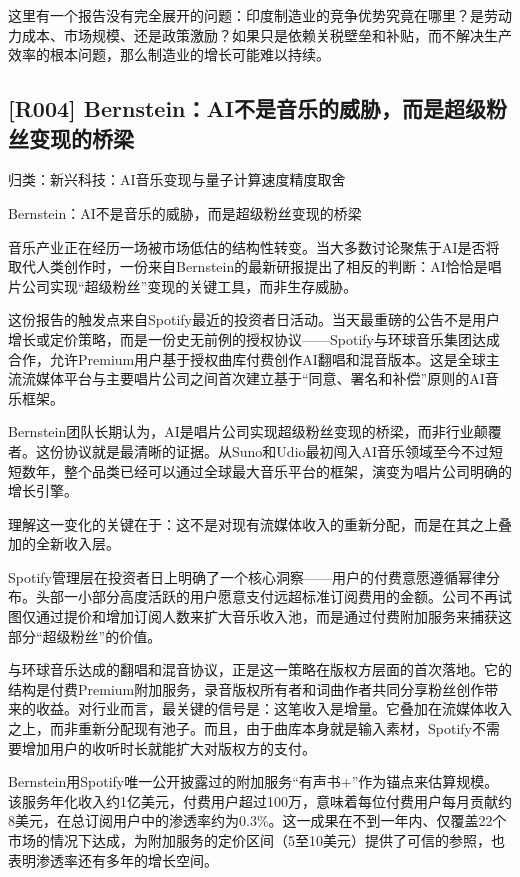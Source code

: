 \documentclass[11pt]{ctexart}
\begin{document}
这里有一个报告没有完全展开的问题：印度制造业的竞争优势究竟在哪里？是劳动力成本、市场规模、还是政策激励？如果只是依赖关税壁垒和补贴，而不解决生产效率的根本问题，那么制造业的增长可能难以持续。

\subsection{[R004] Bernstein：AI不是音乐的威胁，而是超级粉丝变现的桥梁}
{\small\color{refgray}归类：新兴科技：AI音乐变现与量子计算速度精度取舍}

Bernstein：AI不是音乐的威胁，而是超级粉丝变现的桥梁

音乐产业正在经历一场被市场低估的结构性转变。当大多数讨论聚焦于AI是否将取代人类创作时，一份来自Bernstein的最新研报提出了相反的判断：AI恰恰是唱片公司实现“超级粉丝”变现的关键工具，而非生存威胁。

这份报告的触发点来自Spotify最近的投资者日活动。当天最重磅的公告不是用户增长或定价策略，而是一份史无前例的授权协议——Spotify与环球音乐集团达成合作，允许Premium用户基于授权曲库付费创作AI翻唱和混音版本。这是全球主流流媒体平台与主要唱片公司之间首次建立基于“同意、署名和补偿”原则的AI音乐框架。

Bernstein团队长期认为，AI是唱片公司实现超级粉丝变现的桥梁，而非行业颠覆者。这份协议就是最清晰的证据。从Suno和Udio最初闯入AI音乐领域至今不过短短数年，整个品类已经可以通过全球最大音乐平台的框架，演变为唱片公司明确的增长引擎。

理解这一变化的关键在于：这不是对现有流媒体收入的重新分配，而是在其之上叠加的全新收入层。

Spotify管理层在投资者日上明确了一个核心洞察——用户的付费意愿遵循幂律分布。头部一小部分高度活跃的用户愿意支付远超标准订阅费用的金额。公司不再试图仅通过提价和增加订阅人数来扩大音乐收入池，而是通过付费附加服务来捕获这部分“超级粉丝”的价值。

与环球音乐达成的翻唱和混音协议，正是这一策略在版权方层面的首次落地。它的结构是付费Premium附加服务，录音版权所有者和词曲作者共同分享粉丝创作带来的收益。对行业而言，最关键的信号是：这笔收入是增量。它叠加在流媒体收入之上，而非重新分配现有池子。而且，由于曲库本身就是输入素材，Spotify不需要增加用户的收听时长就能扩大对版权方的支付。

Bernstein用Spotify唯一公开披露过的附加服务“有声书+”作为锚点来估算规模。该服务年化收入约1亿美元，付费用户超过100万，意味着每位付费用户每月贡献约8美元，在总订阅用户中的渗透率约为0.3\%。这一成果在不到一年内、仅覆盖22个市场的情况下达成，为附加服务的定价区间（5至10美元）提供了可信的参照，也表明渗透率还有多年的增长空间。
\end{document}
